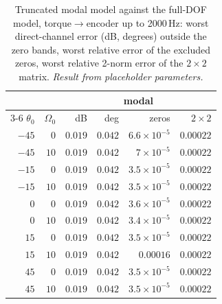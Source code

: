 \documentclass[10pt,a4paper]{article}
\numberwithin{equation}{section}
\begin{document}
\begin{table}[H]\centering\small\setlength{\tabcolsep}{4pt}
\caption{Truncated modal model against the full-DOF model, torque$\to$encoder up to 2000\,Hz: worst direct-channel error (dB, degrees) outside the zero bands, worst relative error of the excluded zeros, worst relative 2-norm error of the $2\times2$ matrix. \emph{Result from placeholder parameters.}}\label{tab:modal_vs_full}
\begin{tabular}{rrrrrr}\toprule
& & \multicolumn{4}{c}{modal} \\ \cmidrule(lr){3-6}
$\theta_0$ & $\Omega_0$ & dB & deg & zeros & $2\times2$ \\ \midrule
$-45$ & $0$ & $0.019$ & $0.042$ & $6.6\times10^{-5}$ & $0.00022$ \\
$-45$ & $10$ & $0.019$ & $0.042$ & $7\times10^{-5}$ & $0.00022$ \\
$-15$ & $0$ & $0.019$ & $0.042$ & $3.5\times10^{-5}$ & $0.00022$ \\
$-15$ & $10$ & $0.019$ & $0.042$ & $3.5\times10^{-5}$ & $0.00022$ \\
$0$ & $0$ & $0.019$ & $0.042$ & $3.6\times10^{-5}$ & $0.00022$ \\
$0$ & $10$ & $0.019$ & $0.042$ & $3.4\times10^{-5}$ & $0.00022$ \\
$15$ & $0$ & $0.019$ & $0.042$ & $3.5\times10^{-5}$ & $0.00022$ \\
$15$ & $10$ & $0.019$ & $0.042$ & $0.00016$ & $0.00022$ \\
$45$ & $0$ & $0.019$ & $0.042$ & $3.5\times10^{-5}$ & $0.00022$ \\
$45$ & $10$ & $0.019$ & $0.042$ & $3.5\times10^{-5}$ & $0.00022$ \\
\bottomrule\end{tabular}\end{table}
\end{document}
